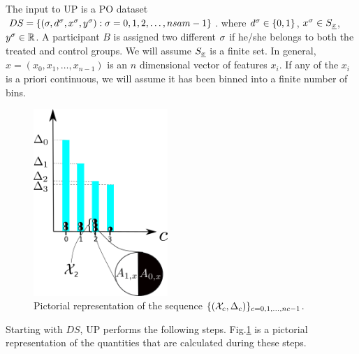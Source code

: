 The input
to UP is a PO
dataset $DS= \{ (\sigma, d^\sigma, x^\sigma, y^\sigma):
 \sigma=0,1, 2, \ldots, nsam-1\}$.
where $d^\sigma\in \{0,1\}$, $x^\sigma \in S_{\underline{x}}$,
$y^\sigma\in { \mathbb{R}}$.
A  participant $B$
is assigned two different
$\sigma$
if he/she
belongs to
both the treated and control groups.
We will assume 
$S_{\underline{x}}$ is a finite set.
In general,
$x=(x_0, x_1,\dots, x_{n-1})$ is an $n$ dimensional 
vector of features $x_i$.
If any of the $x_i$
is a priori continuous, we will
assume it has  been binned into
a finite number of bins.

\begin{figure}[h!]
\centering
\includegraphics[width=2in]
{uplift/uplift-bins.png}
\caption{
Pictorial
representation
of the sequence
$\{({\cal X}_c, \Delta_c)\}_{c=0,1, \ldots, nc-1}$.
}
\label{fig-uplift-bins}
\end{figure}


Starting with $DS$,
UP performs the following steps.
Fig.\ref{fig-uplift-bins}
is a pictorial representation
of the quantities
that are calculated
during these steps.

